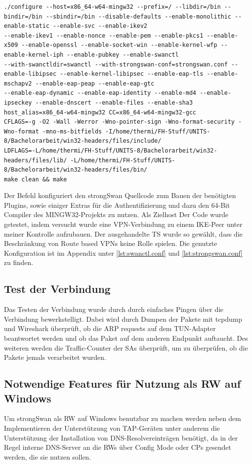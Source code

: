 \begin{lstlisting}[caption=./configure und make]
./configure --host=x86_64-w64-mingw32 --prefix=/ --libdir=/bin --bindir=/bin --sbindir=/bin --disable-defaults --enable-monolithic --enable-static --enable-svc --enable-ikev2 
--enable-ikev1 --enable-nonce --enable-pem --enable-pkcs1 --enable-x509 --enable-openssl --enable-socket-win --enable-kernel-wfp --enable-kernel-iph --enable-pubkey --enable-swanctl 
--with-swanctldir=swanctl --with-strongswan-conf=strongswan.conf --enable-libipsec --enable-kernel-libipsec --enable-eap-tls --enable-mschapv2 --enable-eap-peap --enable-eap-gtc 
--enable-eap-dynamic --enable-eap-identity --enable-md4 --enable-ipseckey --enable-dnscert --enable-files --enable-sha3 host_alias=x86_64-w64-mingw32 CC=x86_64-w64-mingw32-gcc 
CFLAGS=-g -O2 -Wall -Werror -Wno-pointer-sign -Wno-format-security -Wno-format -mno-ms-bitfields -I/home/thermi/FH-Stuff/UNITS-8/Bachelorarbeit/win32-headers/files/include/ 
LDFLAGS=-L/home/thermi/FH-Stuff/UNITS-8/Bachelorarbeit/win32-headers/files/lib/ -L/home/thermi/FH-Stuff/UNITS-8/Bachelorarbeit/win32-headers/files/bin/
make clean && make
\end{lstlisting}


Der Befehl konfiguriert den strongSwan Quellcode zum Bauen der benötigten Plugins, sowie einiger
Extras für die Authentifizierung und dazu den 64-Bit Compiler des MINGW32-Projekts zu nutzen.
Als Zielhost
Der Code wurde getestet, indem versucht wurde eine VPN-Verbindung zu einem \ac{IKE}-Peer
unter meiner Kontrolle aufzubauen. Der ausgehandelte \ac{TS} wurde so gewählt, dass
die Beschränkung von Route based VPNs keine Rolle spielen.
Die genutzte Konfiguration ist im Appendix unter \autoref{lst:swanctl.conf}
und \autoref{lst:strongswan.conf} zu finden.

\subsection{Test der Verbindung}
Das Testen der Verbindung wurde durch durch einfaches Pingen über die Verbindung bewerkstelligt.
Dabei wird durch Dumpen der Pakete mit tcpdump und Wireshark überprüft, ob die
ARP requests auf dem TUN-Adapter beantwortet werden und ob das Paket auf dem
anderen Endpunkt auftaucht. Des weiteren werden die Traffic-Counter der \acp{SA} überprüft,
um zu überprüfen, ob die Pakete jemals verarbeitet wurden.

\subsection{Notwendige Features für Nutzung als RW auf Windows}
Um strongSwan als \ac{RW} auf Windows benutzbar zu machen werden neben dem Implementieren
der Unterstützung von TAP-Geräten unter anderem die Unterstützung der Installation von DNS-Resolvereinträgen
benötigt, da in der Regel interne DNS-Server an die \acp{RW} über Config Mode oder \acp{CP}
gesendet werden, die sie nutzen sollen.

